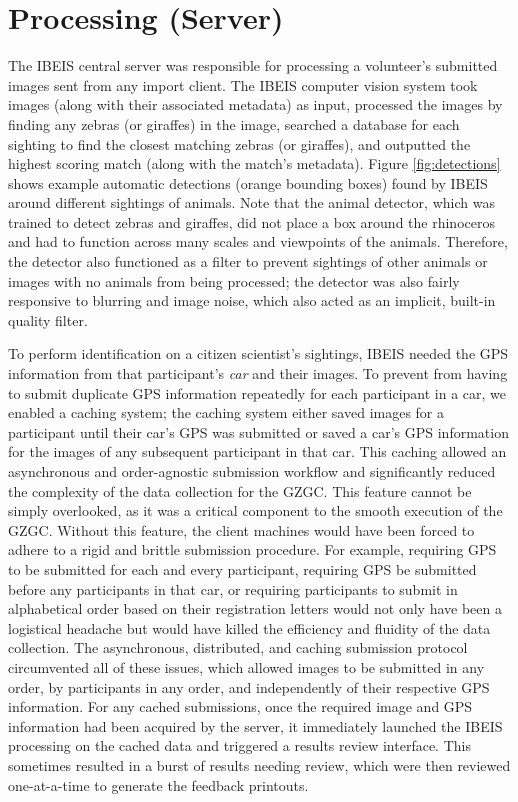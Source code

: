 \section{Processing (Server)}
The IBEIS central server was responsible for processing a volunteer's submitted images sent from any import client.  The IBEIS computer vision system took images (along with their associated metadata) as input, processed the images by finding any zebras (or giraffes) in the image, searched a database for each sighting to find the closest matching zebras (or giraffes), and outputted the highest scoring match (along with the match's metadata).  Figure \ref{fig:detections} shows example automatic detections (orange bounding boxes) found by IBEIS around different sightings of animals.  Note that the animal detector, which was trained to detect zebras and giraffes, did not place a box around the rhinoceros and had to function across many scales and viewpoints of the animals.  Therefore, the detector also functioned as a filter to prevent sightings of other animals or images with no animals from being processed; the detector was also fairly responsive to blurring and image noise, which also acted as an implicit, built-in quality filter.

To perform identification on a citizen scientist's sightings, IBEIS needed the GPS information from that participant's \textit{car} and their images.  To prevent from having to submit duplicate GPS information repeatedly for each participant in a car, we enabled a caching system; the caching system either saved images for a participant until their car's GPS was submitted or saved a car's GPS information for the images of any subsequent participant in that car.  This caching allowed an asynchronous and order-agnostic submission workflow and significantly reduced the complexity of the data collection for the GZGC.  This feature cannot be simply overlooked, as it was a critical component to the smooth execution of the GZGC.  Without this feature, the client machines would have been forced to adhere to a rigid and brittle submission procedure.  For example, requiring GPS to be submitted for each and every participant, requiring GPS be submitted before any participants in that car, or requiring participants to submit in alphabetical order based on their registration letters would not only have been a logistical headache but would have killed the efficiency and fluidity of the data collection.  The asynchronous, distributed, and caching submission protocol circumvented all of these issues, which allowed images to be submitted in any order, by participants in any order, and independently of their respective GPS information.  For any cached submissions, once the required image and GPS information had been acquired by the server, it immediately launched the IBEIS processing on the cached data and triggered a results review interface.  This sometimes resulted in a burst of results needing review, which were then reviewed one-at-a-time to generate the feedback printouts.

